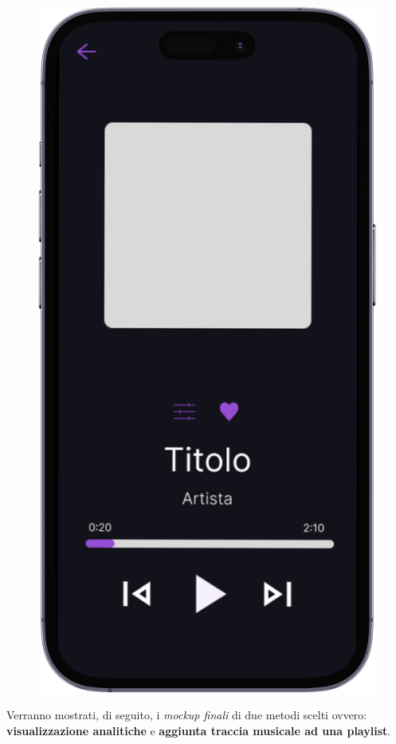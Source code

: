\documentclass{article}
\begin{document}
\begin{figure}[htbp]
\begin{minipage}{0.18\textwidth}
					\includegraphics[width=\textwidth]{Immagini/foto7}
				\end{minipage}
			\end{figure}
			\newpage
		Verranno mostrati, di seguito, i\textit{ mockup finali} di due metodi scelti ovvero: \textbf{visualizzazione analitiche} e \textbf{aggiunta traccia musicale ad una playlist}.
\end{document}
